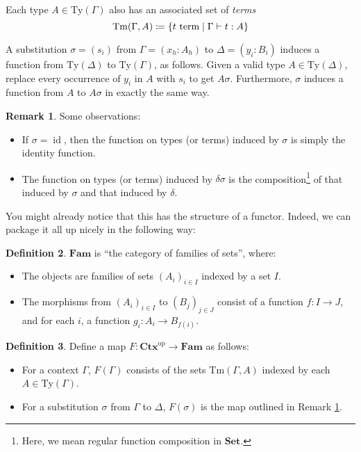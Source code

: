 \documentclass{article}
\theoremstyle{definition}
\newtheorem{definition}{Definition}[section]
\newtheorem{remark}[definition]{Remark}
\newcommand{\proves}{\vdash}
\newcommand{\comp}[2]{#2#1}%
\newcommand{\substType}[2]{#2#1}%
\newcommand{\C}{\mathbf{Ctx}}
\newcommand{\Fam}{\mathbf{Fam}}
\newcommand{\Set}{\mathbf{Set}}
\newcommand{\Ty}{\mathrm{Ty}}
\newcommand{\Tm}{\mathrm{Tm}}
\newcommand{\op}[1]{{#1}^\mathrm{op}}           %
\DeclareMathOperator{\id}{id}				    %
\newcommand{\defeq}{
	\mathrel{\mathrel{\mathop:}\mkern-1.2mu=}}	%
\begin{document}
Each type $A \in \Ty(\Gamma)$ also has an associated set of \textit{terms} $$\Tm(\Gamma,A) \defeq \{ t \text{ term} \mid \Gamma \proves t : A \}$$

A substitution $\sigma = (s_i)$ from $\Gamma = (x_h : A_h)$ to $\Delta = (y_i : B_i)$ induces a function from $\Ty(\Delta)$ to $\Ty(\Gamma)$, as follows. Given a valid type $A \in \Ty(\Delta)$, replace every occurrence of $y_i$ in $A$ with $s_i$ to get $\substType{\sigma}{A}$. Furthermore, $\sigma$ induces a function from $A$ to $\substType{\sigma}{A}$ in exactly the same way.

\begin{remark}\label{rmk:term-func}
    Some observations:
    
    \begin{itemize}
        \item If $\sigma = \id$, then the function on types (or terms) induced by $\sigma$ is simply the identity function.
        
        \item The function on types (or terms) induced by $\comp{\sigma}{\delta}$ is the composition\footnote{Here, we mean regular function composition in $\Set$.} of that induced by $\sigma$ and that induced by $\delta$.
    \end{itemize}
\end{remark}

You might already notice that this has the structure of a functor. Indeed, we can package it all up nicely in the following way:

\begin{definition}
    $\Fam$ is ``the category of families of sets'', where:
    \begin{itemize}
        \item The objects are families of sets $(A_i)_{i \in I}$ indexed by a set $I$.
        
        \item The morphisms from $(A_i)_{i \in I}$ to $(B_j)_{j \in J}$ consist of a function $f\colon I \to J$, and for each $i$, a function $g_i\colon A_i \to B_{f(i)}$.
    \end{itemize}
\end{definition}


\begin{definition}
    Define a map $F\colon \op{\C} \to \Fam$ as follows:
    \begin{itemize}
        \item For a context $\Gamma$, $F(\Gamma)$ consists of the sets $\Tm(\Gamma,A)$ indexed by each $A \in \Ty(\Gamma)$.
        
        \item For a substitution $\sigma$ from $\Gamma$ to $\Delta$, $F(\sigma)$ is the map outlined in Remark \ref{rmk:term-func}.
    \end{itemize}
\end{definition}
\end{document}
